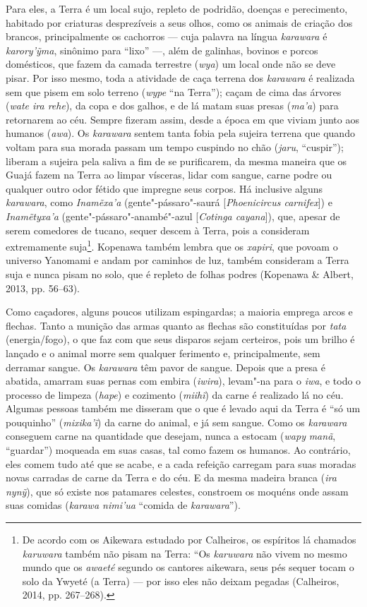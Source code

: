 Para eles, a Terra é um local sujo, repleto de podridão, doenças e
perecimento, habitado por criaturas desprezíveis a seus olhos, como os
animais de criação dos brancos, principalmente os cachorros --- cuja
palavra na língua \emph{karawara} é \emph{karory'ỹma}, sinônimo para
``lixo'' ---, além de galinhas, bovinos e porcos domésticos, que fazem da
camada terrestre (\emph{wya}) um local onde não se deve pisar. Por isso
mesmo, toda a atividade de caça terrena dos \emph{karawara} é realizada
sem que pisem em solo terreno (\emph{wype} ``na Terra''); caçam de cima
das árvores (\emph{wate ira rehe}), da copa e dos galhos, e de lá matam
suas presas (\emph{ma'a}) para retornarem ao céu. Sempre fizeram assim,
desde a época em que viviam junto aos humanos (\emph{awa}). Os
\emph{karawara} sentem tanta fobia pela sujeira terrena que quando
voltam para sua morada passam um tempo cuspindo no chão (\emph{jaru},
``cuspir''); liberam a sujeira pela saliva a fim de se purificarem, da
mesma maneira que os Guajá fazem na Terra ao limpar vísceras, lidar com
sangue, carne podre ou qualquer outro odor fétido que impregne seus
corpos. Há inclusive alguns \emph{karawara}, como \emph{Inamẽxa'a}
(gente"-pássaro"-saurá {[}\emph{Phoenicircus carnifex}{]}) e
\emph{Inamẽtyxa'a} (gente"-pássaro"-anambé"-azul {[}\emph{Cotinga
cayana}{]}), que, apesar de serem comedores de tucano, sequer descem à
Terra, pois a consideram extremamente suja\footnote{De acordo com os
  Aikewara estudado por Calheiros, os espíritos lá chamados
  \emph{karuwara} também não pisam na Terra: ``Os \emph{karuwara} não
  vivem no mesmo mundo que os \emph{awaeté} segundo os cantores
  aikewara, seus pés sequer tocam o solo da Ywyeté (a Terra) --- por isso
  eles não deixam pegadas (Calheiros, 2014, pp. 267--268).}. Kopenawa também
lembra que os \emph{xapiri}, que povoam o universo Yanomami e andam por
caminhos de luz, também consideram a Terra suja e nunca pisam no solo,
que é repleto de folhas podres (Kopenawa \& Albert, 2013, pp. 56--63).

Como caçadores, alguns poucos utilizam espingardas; a maioria emprega
arcos e flechas. Tanto a munição das armas quanto as flechas são
constituídas por \emph{tata} (energia/fogo), o que faz com que seus
disparos sejam certeiros, pois um brilho é lançado e o animal morre sem
qualquer ferimento e, principalmente, sem derramar sangue. Os
\emph{karawara} têm pavor de sangue. Depois que a presa é abatida,
amarram suas pernas com embira (\emph{iwira}), levam"-na para o
\emph{iwa}, e todo o processo de limpeza (\emph{hape}) e cozimento
(\emph{miihĩ}) da carne é realizado lá no céu. Algumas pessoas também me
disseram que o que é levado aqui da Terra é ``só um pouquinho''
(\emph{mixika'ĩ}) da carne do animal, e já sem sangue. Como os
\emph{karawara} conseguem carne na quantidade que desejam, nunca a
estocam (\emph{wapy} \emph{manã}, ``guardar'') moqueada em suas casas, tal
como fazem os humanos. Ao contrário, eles comem tudo até que se acabe, e
a cada refeição carregam para suas moradas novas carradas de carne da
Terra e do céu. E da mesma madeira branca (\emph{ira} \emph{nynỹ}), que
só existe nos patamares celestes, constroem os moquéns onde assam suas
comidas (\emph{karawa nimi'ua} ``comida de \emph{karawara}'').

